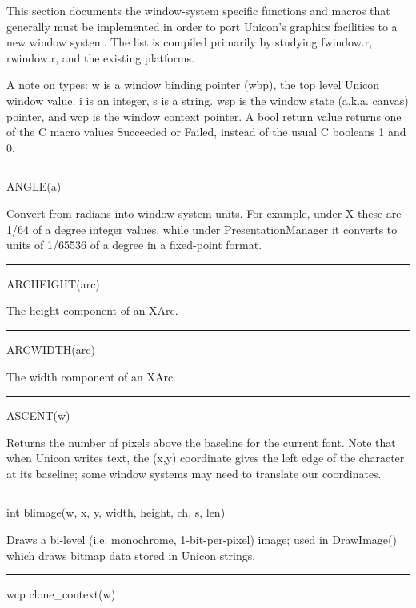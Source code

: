 This section documents the window-system specific functions and macros
that generally must be implemented in order to port Unicon's graphics
facilities to a new window system. The list is compiled primarily by
studying \textsf{fwindow.r}, \textsf{rwindow.r}, and the existing
platforms.


A note on types: \textsf{w} is a window binding pointer
(\textsf{wbp}), the top level Unicon
{\textquotedbl}window{\textquotedbl} value. \textsf{i} is an integer,
\textsf{s} is a string. \textsf{wsp} is the window state
(a.k.a. canvas) pointer, and \textsf{wcp} is the window context
pointer. A \textsf{bool} return value returns one of the C macro
values \textsf{Succeeded} or \textsf{Failed}, instead of the usual C
booleans 1 and 0.


\bigskip\hrule\vspace{0.1cm}
\noindent
ANGLE(a)


Convert from radians into window system units. For example, under X
these are 1/64 of a degree integer values, while under
PresentationManager it converts to units of 1/65536 of a degree in a
fixed-point format.

{\sffamily\bfseries
\bigskip\hrule\vspace{0.1cm}
\noindent
ARCHEIGHT(arc)}


The height component of an XArc.

{\sffamily\bfseries
\bigskip\hrule\vspace{0.1cm}
\noindent
ARCWIDTH(arc)}


The width component of an XArc.

{\sffamily\bfseries
\bigskip\hrule\vspace{0.1cm}
\noindent
ASCENT(w)}


Returns the number of pixels above the baseline for the current
font. Note that when Unicon writes text, the (x,y) coordinate gives
the left edge of the character at its baseline; some window systems
may need to translate our coordinates.

{\sffamily\bfseries
\bigskip\hrule\vspace{0.1cm}
\noindent
int blimage(w, x, y, width, height, ch, s, len)}

Draws a bi-level (i.e. monochrome, 1-bit-per-pixel) image; used in
\textsf{DrawImage()} which draws bitmap data stored in Unicon strings.

{\sffamily\bfseries
\bigskip\hrule\vspace{0.1cm}
\noindent
wcp clone\_context(w)}



